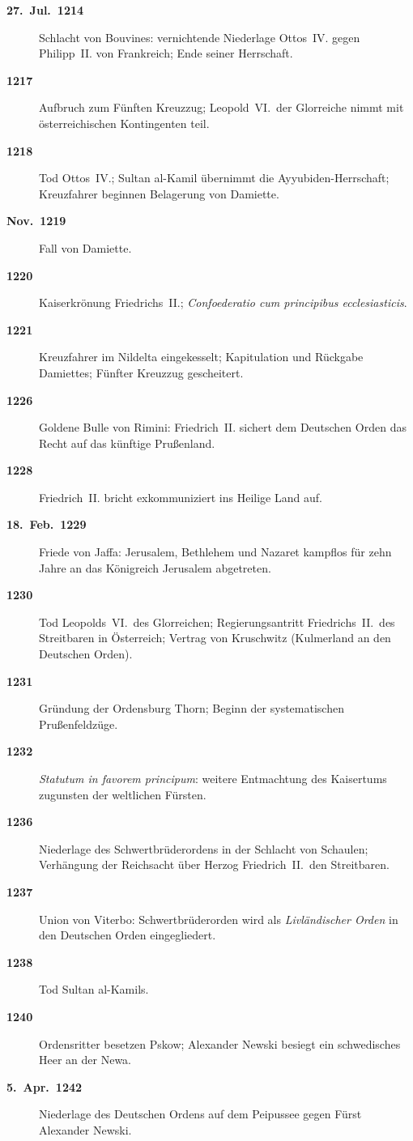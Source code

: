 \begin{description}
  \item[\textbf{27.~Jul.~1214}] Schlacht von Bouvines: vernichtende Niederlage Ottos~IV. gegen Philipp~II. von Frankreich; Ende seiner Herrschaft.
  \item[\textbf{1217}] Aufbruch zum Fünften Kreuzzug; Leopold~VI.~der Glorreiche nimmt mit österreichischen Kontingenten teil.
  \item[\textbf{1218}] Tod Ottos~IV.; Sultan al-Kamil übernimmt die Ayyubiden-Herrschaft; Kreuzfahrer beginnen Belagerung von Damiette.
  \item[\textbf{Nov.~1219}] Fall von Damiette.
  \item[\textbf{1220}] Kaiserkrönung Friedrichs~II.; \textit{Confoederatio cum principibus ecclesiasticis}.
  \item[\textbf{1221}] Kreuzfahrer im Nildelta eingekesselt; Kapitulation und Rückgabe Damiettes; Fünfter Kreuzzug gescheitert.
  \item[\textbf{1226}] Goldene Bulle von Rimini: Friedrich~II. sichert dem Deutschen Orden das Recht auf das künftige Prußenland.
  \item[\textbf{1228}] Friedrich~II. bricht exkommuniziert ins Heilige Land auf.
  \item[\textbf{18.~Feb.~1229}] Friede von Jaffa: Jerusalem, Bethlehem und Nazaret kampflos für zehn Jahre an das Königreich Jerusalem abgetreten.
  \item[\textbf{1230}] Tod Leopolds~VI.~des Glorreichen; Regierungsantritt Friedrichs~II.~des Streitbaren in Österreich; Vertrag von Kruschwitz (Kulmerland an den Deutschen Orden).
  \item[\textbf{1231}] Gründung der Ordensburg Thorn; Beginn der systematischen Prußenfeldzüge.
  \item[\textbf{1232}] \textit{Statutum in favorem principum}: weitere Entmachtung des Kaisertums zugunsten der weltlichen Fürsten.
  \item[\textbf{1236}] Niederlage des Schwertbrüderordens in der Schlacht von Schaulen; Verhängung der Reichsacht über Herzog Friedrich~II.~den Streitbaren.
  \item[\textbf{1237}] Union von Viterbo: Schwertbrüderorden wird als \textit{Livländischer Orden} in den Deutschen Orden eingegliedert.
  \item[\textbf{1238}] Tod Sultan al-Kamils.
  \item[\textbf{1240}] Ordensritter besetzen Pskow; Alexander Newski besiegt ein schwedisches Heer an der Newa.
  \item[\textbf{5.~Apr.~1242}] Niederlage des Deutschen Ordens auf dem Peipussee gegen Fürst Alexander Newski.

\end{description}
